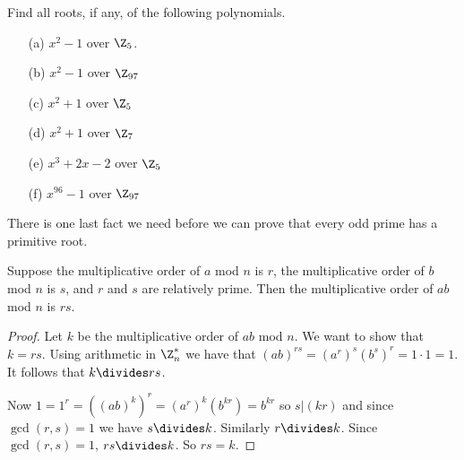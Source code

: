 \documentclass[oneside,12pt]{amsart}
\begin{document}
\begin{homework} Find all roots, if any, of the following polynomials.
\begin{enumerate}
\item[(a)] $x^2-1$ over $\Z_5$.
\item[(b)] $x^2 - 1$ over $\Z_{97}$
\item[(c)] $x^2 + 1$ over $\Z_5$
\item[(d)] $x^2 + 1$ over $\Z_7$
\item[(e)] $x^3 + 2x -2$ over $\Z_5$
\item[(f)] $x^{96} - 1$ over $\Z_{97}$
\end{enumerate}
\end{homework}

There is one last fact we need before we can prove that every odd prime has a primitive root.

\begin{lemma}
\label{OrderOfAProduct}
Suppose the multiplicative order of $a$ mod $n$ is $r$, the multiplicative order of $b$ mod $n$ is $s$, and $r$ and $s$ are relatively prime. 
Then the multiplicative order of $ab$ mod $n$ is $rs$.
\end{lemma}
\begin{proof}
Let $k$ be the multiplicative order of $ab$ mod $n$. We want to show that $k=rs$. Using arithmetic in $\Z^*_n$ we have that
$(ab)^{rs} = (a^r)^s(b^s)^r=1\cdot1 = 1$. It follows that $k\divides rs$.

Now $1=1^r=((ab)^k)^r = (a^r)^k(b^{kr}) = b^{kr}$ so $s|(kr)$ and since $\gcd(r,s)=1$ we have $s\divides k$.
Similarly $r\divides k$. Since $\gcd(r,s)=1$, $rs\divides k$. So $rs=k$.
\end{proof}
\end{document}
